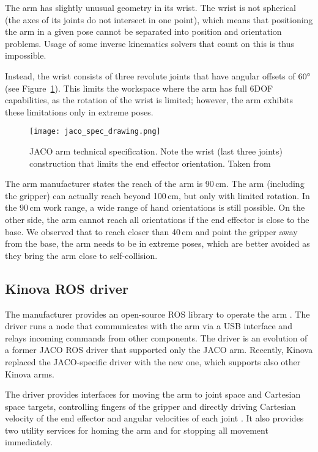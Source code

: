 \documentclass[buriama8_dp.tex]{subfiles}
\begin{document}
The arm has slightly unusual geometry in its wrist. The wrist is not spherical (the axes of its joints do not intersect in one point), which means that positioning the arm in a given pose cannot be separated into position and orientation problems. Usage of some inverse kinematics solvers that count on this is thus impossible.

Instead, the wrist consists of three revolute joints that have angular offsets of \(60^\circ\) (see Figure~\ref{fig:jaco_schema}). This limits the workspace where the arm has full 6DOF capabilities, as the rotation of the wrist is limited; however, the arm exhibits these limitations only in extreme poses.

\begin{figure}[ht]
  \centering
  \texttt{[image: jaco\_spec\_drawing.png]}
  \caption[JACO blueprint]{JACO arm technical specification. Note the wrist (last three joints) construction that limits the end effector orientation. Taken from \cite{jaco_spec}}
  \label{fig:jaco_schema}
\end{figure}

The arm manufacturer states the reach of the arm is 90\,cm. The arm (including the gripper) can actually reach beyond 100\,cm, but only with limited rotation. In the 90\,cm work range, a wide range of hand orientations is still possible. On the other side, the arm cannot reach all orientations if the end effector is close to the base. We observed that to reach closer than 40\,cm and point the gripper away from the base, the arm needs to be in extreme poses, which are better avoided as they bring the arm close to self-collision.

\subsection{Kinova ROS driver}
\label{subsec:kinova_ros}

The manufacturer provides an open-source ROS library to operate the arm \cite{kinova_ros}. The driver runs a node that communicates with the arm via a USB interface and relays incoming commands from other components. The driver is an evolution of a former JACO ROS driver that supported only the JACO arm. Recently, Kinova replaced the JACO-specific driver with the new one, which supports also other Kinova arms.

The driver provides interfaces for moving the arm to joint space and Cartesian space targets, controlling fingers of the gripper and directly driving Cartesian velocity of the end effector and angular velocities of each joint \cite{kinova_ros_api}. It also provides two utility services for homing the arm and for stopping all movement immediately.
\end{document}
